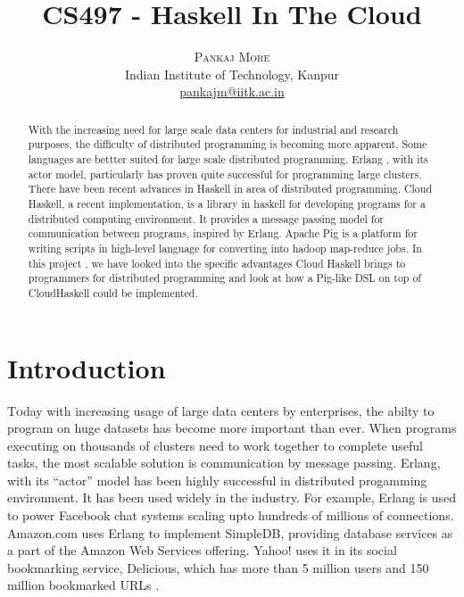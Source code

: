 \documentclass[twoside]{article}
\title{\vspace{-15mm}\fontsize{24pt}{10pt}\selectfont\textbf{CS497 - Haskell
    In The Cloud}} %
\author{
\large
\textsc{Pankaj More}\\[2mm] %
\normalsize Indian Institute of Technology, Kanpur \\ %
\normalsize \href{mailto:pankajm@iitk.ac.in}{pankajm@iitk.ac.in} %
\vspace{-5mm}
}
\date{}
\begin{document}
\maketitle %

\thispagestyle{fancy} %


\begin{abstract}

  With the increasing need for large scale data centers for industrial
  and research purposes, the difficulty of distributed programming is
  becoming more apparent. Some languages are bettter suited for large
  scale distributed programming. Erlang , with its actor model,
  particularly has proven quite successful for programming large
  clusters. There have been recent advances in Haskell in area of
  distributed programming. Cloud Haskell, a recent implementation, is
  a library in haskell for developing programs for a distributed
  computing environment. It provides a message passing model for
  communication between programs, inspired by Erlang. Apache Pig is a
  platform for writing scripts in high-level language for converting
  into hadoop map-reduce jobs. In this project , we have looked into
  the specific advantages Cloud Haskell brings to programmers for
  distributed programming and look at how a Pig-like DSL on top of
  CloudHaskell could be implemented.

\end{abstract}

\tableofcontents 

\pagebreak

\section{Introduction}

\lettrine[nindent=0em,lines=3]{T} oday with increasing usage of large
data centers \cite{newagedcs} by enterprises, the abilty to program on
huge datasets has become more important than ever. When programs
executing on thousands of clusters need to work together to complete
useful tasks, the most scalable solution is communication by message
passing. Erlang, with its ``actor'' model has been highly successful
in distributed progamming environment. It has been used widely in the
industry. For example, Erlang is used to power Facebook chat systems
\cite{facebook} scaling upto hundreds of millions of connections.
Amazon.com uses Erlang to implement SimpleDB, providing database
services as a part of the Amazon Web Services offering. Yahoo! uses it
in its social bookmarking service, Delicious, which has more than 5
million users and 150 million bookmarked URLs \cite{wiki_erlang}.
\end{document}
